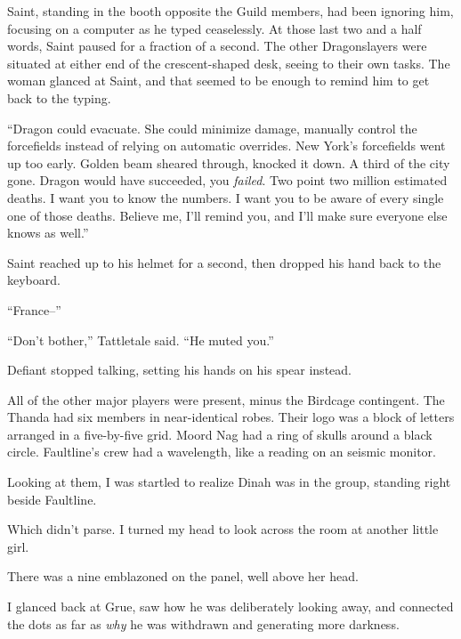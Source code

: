 Saint, standing in the booth opposite the Guild members, had been ignoring him, focusing on a computer as he typed ceaselessly.  At those last two and a half words, Saint paused for a fraction of a second.  The other Dragonslayers were situated at either end of the crescent-shaped desk, seeing to their own tasks.  The woman glanced at Saint, and that seemed to be enough to remind him to get back to the typing.



``Dragon could evacuate.  She could minimize damage, manually control the forcefields instead of relying on automatic overrides.  New York's forcefields went up too early.  Golden beam sheared through, knocked it down.  A third of the city gone.  Dragon would have succeeded, you \emph{failed}.  Two point two million estimated deaths.  I want you to know the numbers.  I want you to be aware of every single one of those deaths.  Believe me, I'll remind you, and I'll make sure everyone else knows as well.''



Saint reached up to his helmet for a second, then dropped his hand back to the keyboard.



``France--''



``Don't bother,'' Tattletale said.  ``He muted you.''



Defiant stopped talking, setting his hands on his spear instead.



All of the other major players were present, minus the Birdcage contingent.  The Thanda had six members in near-identical robes.  Their logo was a block of letters arranged in a five-by-five grid.  Moord Nag had a ring of skulls around a black circle.  Faultline's crew had a wavelength, like a reading on an seismic monitor.



Looking at them, I was startled to realize Dinah was in the group, standing right beside Faultline.



Which didn't parse.  I turned my head to look across the room at another little girl.



There was a nine emblazoned on the panel, well above her head.



I glanced back at Grue, saw how he was deliberately looking away, and connected the dots as far as \emph{why} he was withdrawn and generating more darkness.



